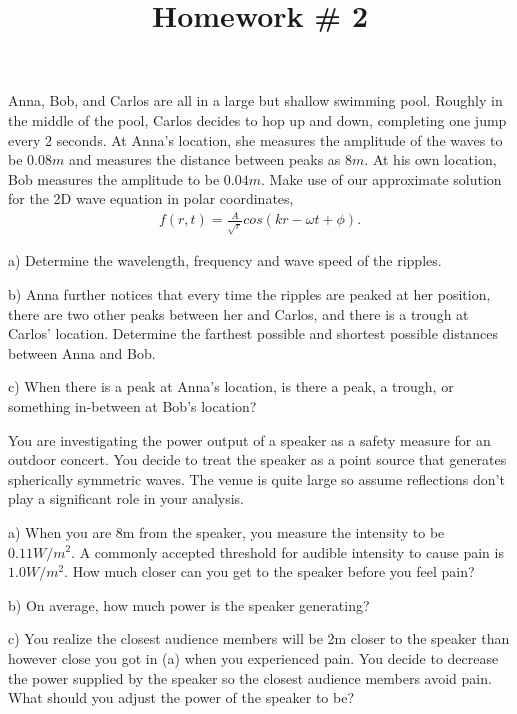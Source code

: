 \documentclass[10pt]{article}
\newenvironment{problem}[2][Problem]{\begin{trivlist}
\item[\hskip \labelsep {\bfseries #1}\hskip \labelsep {\bfseries #2.}]}{\end{trivlist}}
\begin{document}
 \title{Homework \# 2}
\date{}
\maketitle

\begin{problem}{1}
Anna, Bob, and Carlos are all in a large but shallow swimming pool. Roughly in the middle of the pool, Carlos decides to hop up and down, completing one jump every 2 seconds. At Anna's location, she measures the amplitude of the waves to be $0.08m$ and measures the distance between peaks as $8m$. At his own location, Bob measures the amplitude to be $0.04m$. Make use of our approximate solution for the 2D wave equation in polar coordinates,
\begin{align}
f(r, t) = \frac{A}{\sqrt{r}} cos (kr - \omega t + \phi). \nonumber
\end{align}

\item a) Determine the wavelength, frequency and wave speed of the ripples.
\item b) Anna further notices that every time the ripples are peaked at her position, there are two other peaks between her and Carlos, and there is a trough at Carlos' location. Determine the farthest possible and shortest possible distances between Anna and Bob.
\item c) When there is a peak at Anna's location, is there a peak, a trough, or something in-between at Bob's location?
\end{problem}
 
\begin{problem}{2}
You are investigating the power output of a speaker as a safety measure for an outdoor concert. You decide to treat the speaker as a point source that generates spherically symmetric waves. The venue is quite large so assume reflections don't play a significant role in your analysis.
\item a) When you are 8m from the speaker, you measure the intensity to be $0.11W/m^2$. A commonly accepted threshold for audible intensity to cause pain is $1.0W/m^2$. How much closer can you get to the speaker before you feel pain?
\item b) On average, how much power is the speaker generating?
\item c) You realize the closest audience members will be 2m closer to the speaker than however close you got in (a) when you experienced pain. You decide to decrease the power supplied by the speaker so the closest audience members avoid pain. What should you adjust the power of the speaker to be?
\end{problem}
\end{document}
